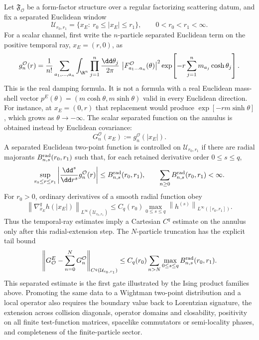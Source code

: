 \begin{controlledapproximation}
\label{ca:form-factor-spectral-reconstruction-window}
Let \(\mathfrak F_{\mathcal O}\) be a form-factor structure over a regular
factorizing scattering datum, and fix a separated Euclidean window
\[
  \mathcal U_{r_0,r_1}
  =
  \{x_E:\ r_0\le |x_E|\le r_1\},
  \qquad 0<r_0<r_1<\infty .
\]
For a scalar channel, first write the \(n\)-particle separated Euclidean term
on the positive temporal ray, \(x_E=(r,0)\), as
\begin{equation}
  g_n^{\mathcal O}(r)
  =
  \frac1{n!}
  \sum_{a_1,\ldots,a_n}
  \int_{\R^n}\prod_{j=1}^n\frac{\dd\theta_j}{2\pi}\,
  \left|F^{\mathcal O}_{a_1\ldots a_n}(\theta)\right|^2
  \exp\!\left[-r\sum_{j=1}^{n}m_{a_j}\cosh\theta_j\right].
  \label{eq:form-factor-separated-euclidean-term}
\end{equation}
This is the real damping formula.  It is not a formula with a real Euclidean
mass-shell vector \(p^E(\theta)=(m\cosh\theta,m\sinh\theta)\) valid in every
Euclidean direction.  For instance, at \(x_E=(0,r)\) that replacement would
produce \(\exp[-rm\sinh\theta]\), which grows as \(\theta\to-\infty\).  The
scalar separated function on the annulus is obtained instead by Euclidean
covariance:
\[
  G_n^{\mathcal O}(x_E):=g_n^{\mathcal O}(|x_E|).
\]
A separated Euclidean two-point function is controlled on
\(\mathcal U_{r_0,r_1}\) if there are radial majorants
\(B_{n,s}^{\rm rad}(r_0,r_1)\) such that, for each retained derivative order
\(0\le s\le q\),
\begin{equation}
  \sup_{r_0\le r\le r_1}
  \left|
    \frac{\dd^s}{\dd r^s}g_n^{\mathcal O}(r)
  \right|
  \le B_{n,s}^{\rm rad}(r_0,r_1),
  \qquad
  \sum_{n\ge0}B_{n,s}^{\rm rad}(r_0,r_1)<\infty .
  \label{eq:form-factor-separated-majorant-condition}
\end{equation}
For \(r_0>0\), ordinary derivatives of a smooth radial function obey
\[
  \left\|\nabla_{x_E}^q h(|x_E|)\right\|_{L^\infty(\mathcal U_{r_0,r_1})}
  \le
  C_q(r_0)\max_{0\le s\le q}
  \left\|h^{(s)}\right\|_{L^\infty([r_0,r_1])}.
\]
Thus the temporal-ray estimates imply a Cartesian \(C^q\) estimate on the
annulus only after this radial-extension step.  The \(N\)-particle truncation
has the explicit tail bound
\begin{equation}
  \left\|
    G_{\mathcal O}^{E}-\sum_{n=0}^{N}G_n^{\mathcal O}
  \right\|_{C^q(\mathcal U_{r_0,r_1})}
  \le
  C_q(r_0)
  \sum_{n>N}\max_{0\le s\le q}B_{n,s}^{\rm rad}(r_0,r_1).
  \label{eq:form-factor-separated-tail-bound}
\end{equation}
This separated estimate is the first gate illustrated by the Ising product
families above.  Promoting the same data to a Wightman two-point distribution
and a local operator also requires the boundary value back to Lorentzian
signature, the extension across collision diagonals, operator domains and
closability, positivity on all finite test-function matrices, spacelike
commutators or semi-locality phases, and completeness of the finite-particle
sector.


\end{controlledapproximation}
